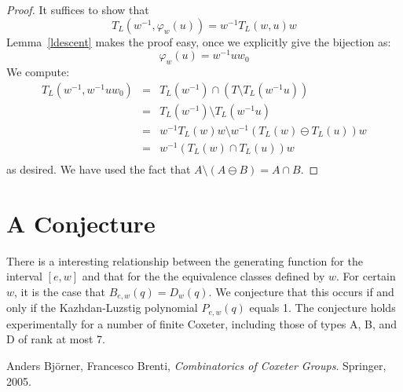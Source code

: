 \documentclass[11pt]{article}
\theoremstyle{definition}
\theoremstyle{definition}
\begin{document}
\begin{proof}
It suffices to show that
\[
T_L(w^{-1}, \varphi_w(u)) = w^{-1}T_L(w, u)w
\]
Lemma~\ref{ldescent} makes the proof easy, once we explicitly give the bijection as:
\[
\varphi_w(u) = w^{-1}uw_0
\]
We compute:
\[
\begin{array}{lcl}
T_L(w^{-1}, w^{-1}uw_0) &=& T_L(w^{-1}) \cap (T \setminus T_L(w^{-1}u))\\
&=& T_L(w^{-1}) \setminus T_L(w^{-1}u)\\
&=& w^{-1}T_L(w)w \setminus w^{-1}(T_L(w) \ominus T_L(u))w\\
&=& w^{-1}(T_L(w) \cap T_L(u))w\\
\end{array}
\]
as desired. We have used the fact that $A \setminus (A \ominus B) = A \cap B$.
\end{proof}

\section{A Conjecture}
There is a interesting relationship between the generating function for the interval $[e, w]$ and that for the the equivalence classes defined by $w$. For certain $w$, it is the case that $B_{e, w}(q) = D_{w}(q)$. We conjecture that this occurs if and only if the Kazhdan-Luzstig polynomial $P_{e, w}(q)$ equals 1. The conjecture holds experimentally for a number of finite Coxeter, including those of types A, B, and D of rank at most 7.

\begin{thebibliography}{9}

  Anders Bj\"{o}rner, Francesco Brenti,
  \emph{Combinatorics of Coxeter Groups}.
  Springer,
  2005.

\end{thebibliography}
\end{document}
